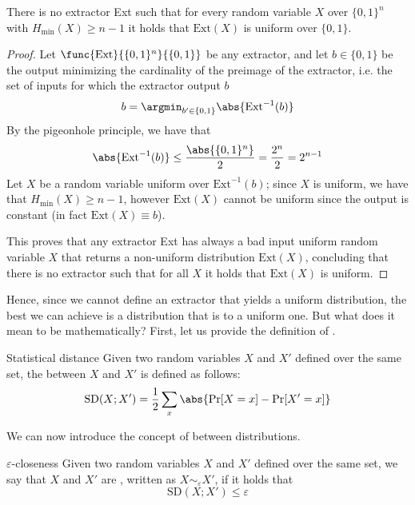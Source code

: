 \documentclass[a4paper, 12pt]{report}
\begin{document}
\begin{framedprop}{}
	There is no extractor Ext such that for every random variable $X$ over $\{0, 1\}^n$ with $H_\mathrm{min}(X) \ge n - 1$ it holds that $\mbox{Ext}(X)$ is uniform over $\{0, 1\}$.
\end{framedprop}

\begin{proof}
	Let $\func{\mbox{Ext}}{\{0, 1\}^n}{\{0, 1\}}$ be any extractor, and let $b \in \{0, 1\}$ be the output minimizing the cardinality of the preimage of the extractor, i.e. the set of inputs for which the extractor output $b$ $$b = \argmin_{b' \in \{0, 1\}}{\abs{\mbox{Ext}^{-1}(b)}}$$ By the pigeonhole principle, we have that $$\abs{\mbox{Ext}^{-1}(b)} \le \dfrac{\abs{\{0, 1\}^n}}{2} = \dfrac{2^n}{2} = 2^{n - 1}$$ Let $X$ be a random variable uniform over $\mbox{Ext}^{-1}(b)$; since $X$ is uniform, we have that $H_\mathrm{min}(X) \ge n- 1$, however $\mbox{Ext}(X)$ cannot be uniform since the output is constant (in fact $\mbox{Ext}(X) \equiv b$).

	This proves that any extractor Ext has always a bad input uniform random variable $X$ that returns a non-uniform distribution $\mbox{Ext}(X)$, concluding that there is no extractor such that for all $X$ it holds that $\mbox{Ext}(X)$ is uniform.
\end{proof}

Hence, since we cannot define an extractor that yields a uniform distribution, the best we can achieve is a distribution that is  to a uniform one. But what does it mean to be  mathematically? First, let us provide the definition of .

\begin{frameddefn}{Statistical distance}
	Given two random variables $X$ and $X'$ defined over the same set, the  between $X$ and $X'$ is defined as follows: $$\mbox{SD}(X; X') = \dfrac{1}{2} \sum_x{\abs{\Pr[X = x] - \Pr[X' = x]}}$$
\end{frameddefn}

We can now introduce the concept of  between distributions.

\begin{frameddefn}{$\varepsilon$-closeness}
	Given two random variables $X$ and $X'$ defined over the same set, we say that $X$ and $X'$ are , written as $X \sim_\varepsilon X'$, if it holds that $$\mbox{SD}(X; X') \le \varepsilon$$
\end{frameddefn}
\end{document}
